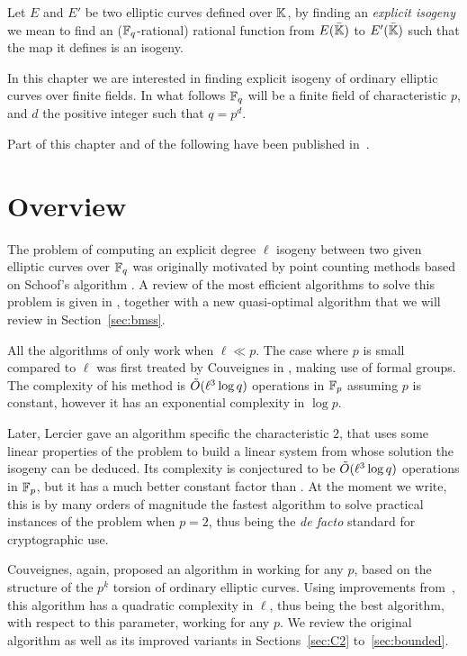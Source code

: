 Let $E$ and $E'$ be two elliptic curves defined over $\mathbb{K}$, by finding
an \emph{explicit isogeny} we mean to find an ($\mathbb{F}_q$-rational)
rational function from $E(\bar{\mathbb{K}})$ to $E'(\bar{\mathbb{K}})$ such that the
map it defines is an isogeny. 

In this chapter we are interested in finding explicit isogeny of
ordinary elliptic curves over finite fields. In what follows $\mathbb{F}_q$
will be a finite field of characteristic $p$, and $d$ the positive
integer such that $q=p^d$.

Part of this chapter and of the following have been published
in~\cite{df10}.


\section{Overview}
\label{sec:history}

The problem of computing an explicit degree $\ell$ isogeny between two
given elliptic curves over $\mathbb{F}_q$ was originally motivated by point
counting methods based on Schoof's algorithm
\cite{atkin88,elkies92,elkies98,schoof95}. A review of the most
efficient algorithms to solve this problem is given in
\cite{bostan+morain+salvy+schost08}, together with a new quasi-optimal
algorithm that we will review in Section~\ref{sec:bmss}.

All the algorithms of \cite{bostan+morain+salvy+schost08} only work
when $\ell\ll p$. The case where $p$ is small compared to $\ell$ was
first treated by Couveignes in \cite{couveignes94}, making use of
formal groups. The complexity of his method is $\tilde{O}(\ell^3\log q)$ operations in
$\mathbb{F}_p$ assuming $p$ is constant, however it has an exponential
complexity in $\log p$.

Later, Lercier \cite{lercier96} gave an algorithm specific the
characteristic $2$, that uses some linear properties of the problem to
build a linear system from whose solution the isogeny can be
deduced. Its complexity is conjectured to be $\tilde{O}(\ell^3\log q)$
operations in $\mathbb{F}_p$, but it has a much better constant factor than
\cite{couveignes94}. At the moment we write, this is by many orders of
magnitude the fastest algorithm to solve practical instances of the
problem when $p=2$, thus being the \emph{de facto} standard for
cryptographic use.

Couveignes, again, proposed an algorithm in \cite{couveignes96}
working for any $p$, based on the structure of the $p^k$ torsion of
ordinary elliptic curves. Using improvements
from~\cite{couveignes00,df+schost09,df10}, this algorithm has a
quadratic complexity in $\ell$, thus being the best algorithm, with
respect to this parameter, working for any $p$. We review the original
algorithm as well as its improved variants in Sections~\ref{sec:C2}
to~\ref{sec:bounded}.

